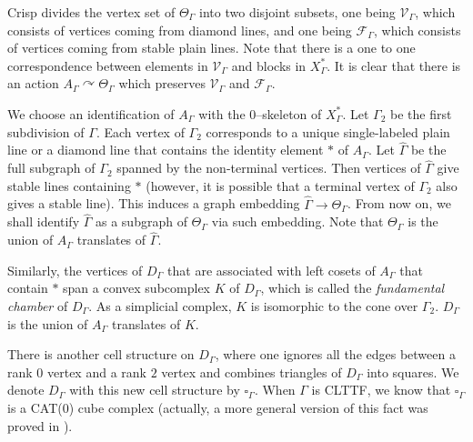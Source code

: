 \documentclass[11pt]{amsart}
\newcommand {\V}{\mathcal V}
\newcommand {\F}{\mathcal F}
\theoremstyle{definition}
\newcommand{\act}{\curvearrowright}
\newcommand{\Xa}{X^{\ast}}
\begin{document}

Crisp divides the vertex set of $\Theta_\Gamma$ into two disjoint subsets, one being $\V_\Gamma$, which consists of vertices coming from diamond lines, and one being $\F_\Gamma$, which consists of vertices coming from stable plain lines. Note that there is a one to one correspondence between elements in $\V_\Gamma$ and blocks in $\Xa_\Gamma$. It is clear that there is an action $A_\Gamma\act \Theta_\Gamma$ which preserves $\V_\Gamma$ and $\F_\Gamma$. 

We choose an identification of $A_\Gamma$ with the $0$--skeleton of $\Xa_\Gamma$. Let $\Gamma_2$ be the first subdivision of $\Gamma$. Each vertex of $\Gamma_2$ corresponds to a unique single-labeled plain line or a diamond line that contains the identity element $\ast$ of $A_\Gamma$. Let $\widehat \Gamma$ be the full subgraph of $\Gamma_2$ spanned by the non-terminal vertices. Then vertices of $\widehat \Gamma$ give stable lines containing $\ast$ (however, it is possible that a terminal vertex of $\Gamma_2$ also gives a stable line). This induces a graph embedding $\widehat \Gamma\to \Theta_\Gamma$. From now on, we shall identify $\widehat \Gamma$ as a subgraph of $\Theta_\Gamma$ via such embedding. Note that $\Theta_\Gamma$ is the union of $A_\Gamma$ translates of $\widehat \Gamma$.

Similarly, the vertices of $D_\Gamma$ that are associated with left cosets of $A_\Gamma$ that contain $\ast$ span a convex subcomplex $K$ of $D_\Gamma$, which is called the \emph{fundamental chamber} of $D_\Gamma$. As a simplicial complex, $K$ is isomorphic to the cone over $\Gamma_2$. $D_\Gamma$ is the union of $A_\Gamma$ translates of $K$.

There is another cell structure on $D_\Gamma$, where one ignores all the edges between a rank $0$ vertex and a rank $2$ vertex and combines triangles of $D_\Gamma$ into squares. We denote $D_\Gamma$ with this new cell structure by $\square_\Gamma$. When $\Gamma$ is CLTTF, we know that $\square_\Gamma$ is a CAT(0) cube complex (actually, a more general version of this fact was proved in \cite{CharneyDavis}). 
\end{document}
